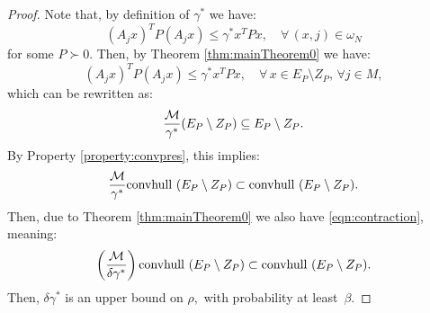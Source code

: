 \begin{proof}Note that, by definition of $\gamma^*$ we have:
\begin{equation*} (A_j x)^TP(A_j x) \leq \gamma^* x^TPx, \quad \forall\, (x, j)  \in \omega_N \end{equation*}
for some $P \succ 0$. Then, by Theorem \ref{thm:mainTheorem0} we have:
\begin{equation*} (A_j x)^TP(A_j x) \leq \gamma^*x^TPx, \quad \forall\, x \in E_P \setminus Z_P,\, \forall j \in M, \end{equation*}
which can be rewritten as:
\begin{equation*}\frac{\mathcal{M}}{\gamma^*}(E_P \setminus Z_P) \subseteq E_P \setminus Z_P.
\end{equation*}
By Property \ref{property:convpres}, this implies:
$$\frac{\mathcal{M}}{\gamma^*} \mbox{convhull }(E_P \setminus Z_P) \subset \mbox{convhull }(E_P \setminus Z_P).$$
Then, due to Theorem \ref{thm:mainTheorem0} we also have \eqref{eqn:contraction}, meaning:
$$\left(\frac{\mathcal{M}}{\delta \gamma^*}\right) \mbox{convhull } (E_P \setminus Z_P) \subset \mbox{convhull } (E_P\setminus Z_P).$$
Then, $\delta\gamma^*$ is an upper bound on $\rho,$ with probability at least~$\beta$. 
\end{proof}
